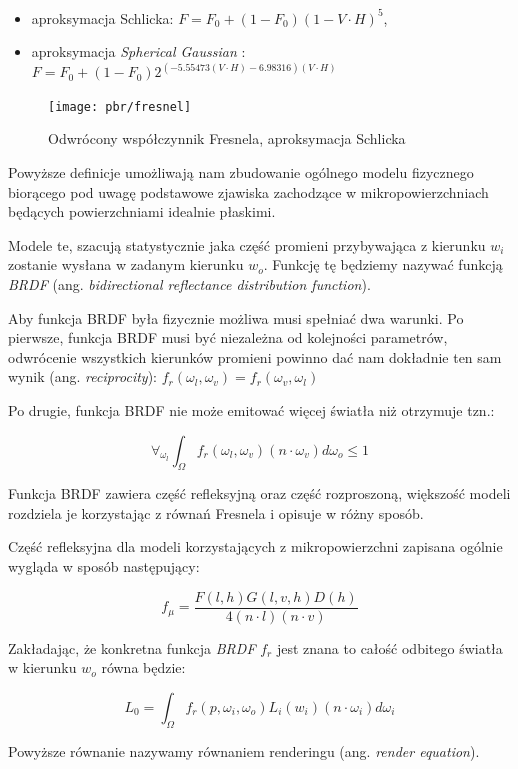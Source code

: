 \documentclass[../main.tex]{subfiles}
\begin{document}
\begin{itemize}
\item aproksymacja Schlicka: $F = F_0 + (1 - F_0)(1-V \cdot H)^5$,
\item aproksymacja \textit{Spherical Gaussian} \cite{SphericalGaussianLegarde}:
	$ F = F_0 +(1−F_0) 2^{
		\left(−5.55473\left(V \cdot H\right)−6.98316\right) (V \cdot H)
	} $
\end{itemize}

\begin{figure}[ht]
	\centering
  \texttt{[image: pbr/fresnel]}
	\caption{Odwrócony współczynnik Fresnela, aproksymacja Schlicka}
\end{figure}

Powyższe definicje umożliwają nam zbudowanie ogólnego modelu fizycznego
biorącego pod uwagę podstawowe zjawiska zachodzące w mikropowierzchniach
będących powierzchniami idealnie płaskimi.

Modele te, szacują statystycznie jaka część promieni przybywająca z kierunku
$w_i$ zostanie wysłana w zadanym kierunku $w_o$. Funkcję tę będziemy nazywać
funkcją \textit{BRDF} (ang. \textit{bidirectional reflectance distribution
function}).

Aby funkcja BRDF była fizycznie możliwa musi spełniać dwa warunki. Po pierwsze,
funkcja BRDF musi być niezależna od kolejności parametrów, odwrócenie
wszystkich kierunków promieni powinno dać nam dokładnie ten sam wynik (ang.
\textit{reciprocity}):
	$f_r(\omega_l, \omega_v) = f_r(\omega_v, \omega_l)$

Po drugie, funkcja BRDF nie może emitować więcej światła niż otrzymuje tzn.:

$$
\forall_{\omega_l} \int_{\Omega} {
    f_r(\omega_l, \omega_v)
    (n \cdot \omega_v) d\omega_o \leq 1
}
$$

Funkcja BRDF zawiera część refleksyjną oraz część rozproszoną, większość modeli
rozdziela je korzystając z równań Fresnela i opisuje w różny sposób.

Część refleksyjna dla modeli korzystających z mikropowierzchni zapisana ogólnie
wygląda w sposób następujący:

\begin{displaymath}
  f_{\mu} = \frac{
    F(l,h) G(l,v,h) D(h)
  }{
    4 (n \cdot l) (n \cdot v)
  }
\end{displaymath}

Zakładając, że konkretna funkcja \textit{BRDF} $f_r$ jest znana to całość
odbitego światła w kierunku $w_o$ równa będzie:

\[
L_0 = \int_{\Omega} {
    f_r(p, \omega_i, \omega_o)
    L_i(w_i)
    (n \cdot \omega_i)
    d \omega_i
}
\]

Powyższe równanie nazywamy równaniem renderingu (ang. \textit{render equation}).
\end{document}
